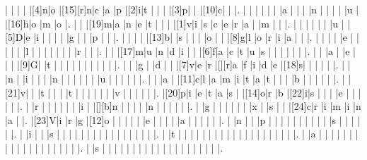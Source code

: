 \documentclass[12pt]{article}
\begin{document}
\begin{Puzzle}{22}{23}
  |{}  |{}  |{}  |{}  |[4]n|o   |[15][r]n|c   |a   |p   |[2]i|t   |{}  |{}  |{} |[3]p|{}   |{}  |[10]c|{}  |{}  |.
  |{}  |{}  |{}  |{}  |{}  |{}  |a   |{}  |{}  |{}  |n   |{}  |{}  |{}  |{}  |u   |{}  |[16]h|o   |m   |o   |.
  |{}  |{}  |[19]m|a   |n   |e   |t   |{}  |{}  |{}  |[1]v|i   |s   |c   |e   |r   |a   |{}  |m   |{}  |{}  |.
  |{}  |{}  |{}  |{}  |{}  |{}  |u   |{}  |[5]D|e   |i   |{}  |{}  |{}  |{}  |g   |{}  |{}  |p   |{}  |{}  |.
  |{}  |{}  |{}  |{}  |[13]b|{}  |s   |{}  |{}  |{}  |o   |{}  |{}  |[8]g|l   |o   |r   |i   |a   |{}  |{}  |.
  |{}  |{}  |{}  |{}  |e   |{}  |{}  |{}  |{}  |{}  |l   |{}  |{}  |{}  |{}  |{}  |{}  |{}  |r   |{}  |{}  |.
  |{}  |{}  |[17]m|u   |n   |d   |i   |{}  |{}  |[6]f|a   |c   |t   |u   |s   |{}  |{}  |{}  |{}  |{}  |{}  |.
  |{}  |{}  |a   |{}  |e   |{}  |{}  |{}  |[9]G|{}  |t   |{}  |{}  |{}  |{}  |{}  |{}  |{}  |{}  |{}  |{}  |.
  |{}  |{}  |g   |{}  |d   |{}  |{}  |[7]v|e   |r   |[][r]a   |f   |i   |d   |e   |[18]s|{}  |{}  |{}  |{}  |{}  |.
  |{}  |{}  |n   |{}  |i   |{}  |{}  |{}  |n   |{}  |{}  |{}  |{}  |{}  |{}  |u   |{}  |{}  |{}  |{}  |{}  |.
  |{}  |{}  |a   |{}  |[11]c|l   |a   |m   |i   |t   |a   |t   |{}  |{}  |{}  |b   |{}  |{}  |{}  |{}  |{}  |.
  |{}  |[21]v|{}  |{}  |t   |{}  |{}  |{}  |t   |{}  |{}  |{}  |{}  |{}  |{}  |v   |{}  |{}  |{}  |{}  |{}  |.
  |[20]p|i   |e   |t   |a   |s   |{}  |[14]o|r   |b   |[22]i|s   |{}  |{}  |{}  |e   |{}  |{}  |{}  |{}  |{}  |.
  |{}  |r   |{}  |{}  |{}  |{}  |{}  |{}  |i   |{}  |[][b]n   |{}  |{}  |{}  |{}  |n   |{}  |{}  |{}  |{}  |{}  |.
  |{}  |g   |{}  |{}  |{}  |{}  |{}  |{}  |x   |{}  |s   |{}  |{}  |[24]c|r   |i   |m   |i   |n   |a   |{}  |.
  |[23]V|i   |r   |g   |[12]o   |{}  |{}  |{}  |{}  |{}  |e   |{}  |{}  |{}  |{}  |a   |{}  |{}  |{}  |{}  |{}  |.
  |{}  |n   |{}  |{}  |p  |{}  |{}  |{}  |{}  |{}  |{}  |{}  |{}  |{}  |{}  |s   |{}  |{}  |{}  |{}  |{}  |.
  |{}  |i   |{}  |{}  |s  |{}  |{}  |{}  |{}  |{}  |{}  |{}  |{}  |{}  |{}  |{}  |{}  |{}  |{}  |{}  |{}  |.
  |{}  |t   |{}  |{}  |{}  |{}  |{}  |{}  |{}  |{}  |{}  |{}  |{}  |{}  |{}  |{}  |{}  |{}  |{}  |{}  |{}  |.
  |{}  |a   |{}  |{}  |{}  |{}  |{}  |{}  |{}  |{}  |{}  |{}  |{}  |{}  |{}  |{}  |{}  |{}  |{}  |{}  |{}  |.
  |{}  |s   |{}  |{}  |{}  |{}  |{}  |{}  |{}  |{}  |{}  |{}  |{}  |{}  |{}  |{}  |{}  |{}  |{}  |{}  |{}  |.
\end{Puzzle}
\end{document}
